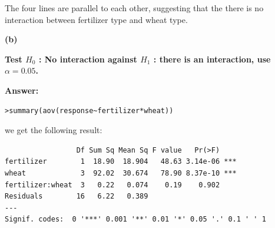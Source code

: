 \documentclass[letterpaper,11pt]{article}
\begin{document}
\begin{center}
\end{center}

The four lines are parallel to each other, suggesting that the there is no interaction between fertilizer type and wheat type.

    \bigbreak
    \begin{addmargin}[-1.1em]{0em}
    \textbf{(b)}\par\end{addmargin}
      \textbf{Test $H_0$ : No interaction against $H_1$ : there is an interaction, use $\alpha = 0.05$.}\par
    \bigbreak
    \begin{addmargin}[-0.5em]{0em}
    \textbf{Answer: }\end{addmargin}


\begin{lstlisting}
>summary(aov(response~fertilizer*wheat))
\end{lstlisting}
  we get the following result:

\begin{lstlisting}
                 Df Sum Sq Mean Sq F value   Pr(>F)
fertilizer        1  18.90  18.904   48.63 3.14e-06 ***
wheat             3  92.02  30.674   78.90 8.37e-10 ***
fertilizer:wheat  3   0.22   0.074    0.19    0.902
Residuals        16   6.22   0.389
---
Signif. codes:  0 '***' 0.001 '**' 0.01 '*' 0.05 '.' 0.1 ' ' 1
\end{lstlisting}
\end{document}
